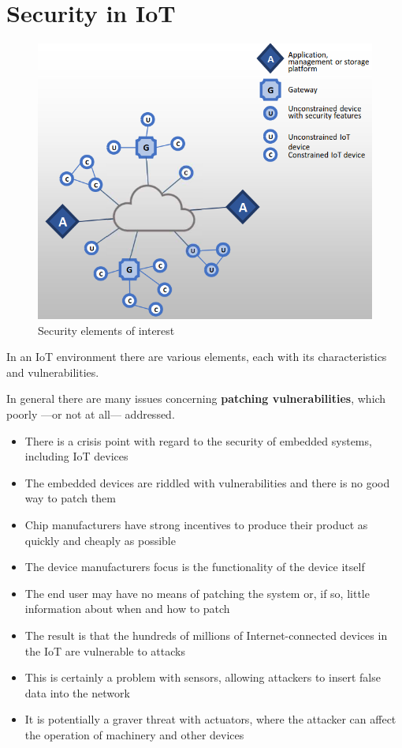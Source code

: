 \section{Security in IoT}
\begin{figure}[htbp]
   \centering
   \includegraphics{images/securityelements.png}
   \caption{Security elements of interest}
   \label{fig:securityelements}
\end{figure}
In an IoT environment there are various elements, each with its characteristics and vulnerabilities.

In general there are many issues concerning \textbf{patching vulnerabilities}, which poorly ---or not at all--- addressed.
\begin{itemize}
   \item There is a crisis point with regard to the security of embedded
   systems, including IoT devices
   \item 
   The embedded devices are riddled with vulnerabilities and there is no
   good way to patch them
   \item Chip manufacturers have strong incentives to produce their product as quickly and cheaply as possible
   \item The device manufacturers focus is the functionality of the device itself
   \item The end user may have no means of patching the system or, if so, little information about when and how to patch
   \item The result is that the hundreds of millions of Internet-connected
   devices in the IoT are vulnerable to attacks
   \item This is certainly a problem with sensors, allowing attackers to insert false data into the network
   \item It is potentially a graver threat with actuators, where the attacker can affect the operation of machinery and other devices
\end{itemize}

